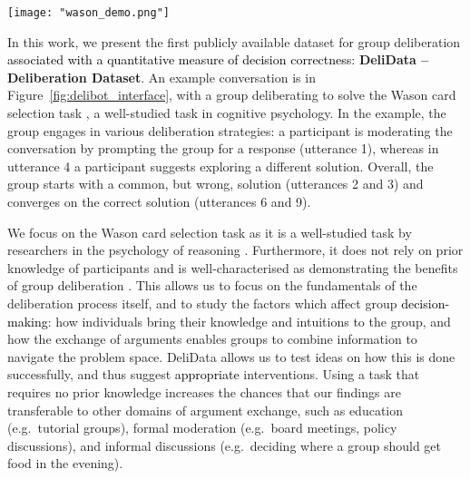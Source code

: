 \documentclass[acmsmall,manuscript,screen]{acmart}
\newcommand\newtext[1]{\textcolor{black}{#1}}
\newcommand\delidata{DeliData }
\begin{document}
\begin{figure*}[t!]
\centering
\texttt{[image: "wason\_demo.png"]}
\caption{Abridged conversation from our dataset between 3 people solving the Wason card selection task}
\label{fig:delibot_interface}
\end{figure*}

In this work, we present the first publicly available dataset for group deliberation \newtext{associated with a quantitative measure of decision correctness}: \textbf{\delidata -- Deliberation Dataset}. An example conversation is in Figure~\ref{fig:delibot_interface}, with a group deliberating to solve the Wason card selection task \citep{wason1968reasoning}, a well-studied task in cognitive psychology. 
In the example, the group engages in various deliberation strategies: a participant is moderating the conversation by prompting the group for a response (utterance 1), whereas in utterance 4 a participant suggests exploring a different solution. Overall, the group starts with a common, but wrong, solution (utterances 2 and 3) and converges on the correct solution (utterances 6 and 9). 

We focus on the Wason card selection task as it is a well-studied task by researchers in the psychology of reasoning \cite{evans2016reasoning}. Furthermore, it does not rely on prior knowledge of participants and is well-characterised as demonstrating the benefits of group deliberation \cite{mercier2011humans}. This allows us to focus on the fundamentals of the deliberation process itself, and to study the factors which affect group \newtext{decision-making}: how individuals bring their knowledge and intuitions to the group, and how the exchange of arguments enables groups to combine information to navigate the problem space. \delidata allows us to test ideas on how this is done successfully, and thus suggest \newtext{appropriate} interventions. Using a task that requires no prior knowledge increases the chances that our findings are transferable to other domains of argument exchange,
such as education (e.g.\ tutorial groups), formal moderation (e.g.\ board meetings, policy discussions), and informal discussions (e.g.\ deciding where a group should get food in the evening).
\end{document}
